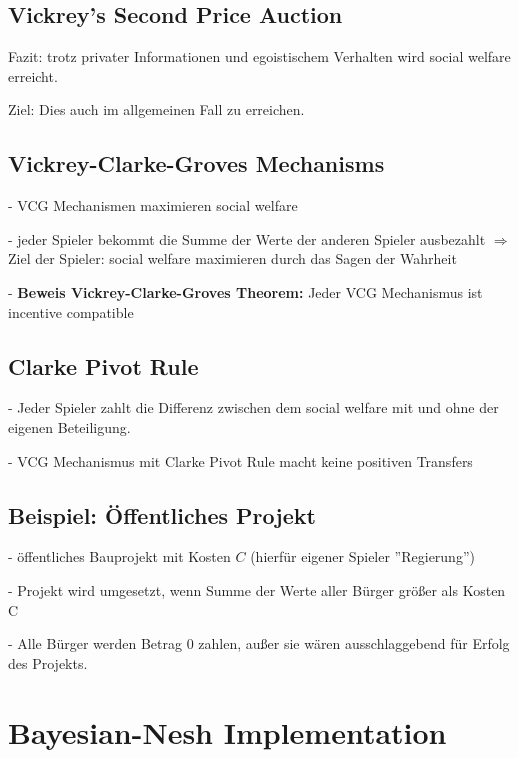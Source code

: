 \documentclass[a4paper,11pt]{article}
\theoremstyle{definition}
\theoremstyle{plain}
\theoremstyle{definition}
\begin{document}
\subsection{Vickrey's Second Price Auction}

Fazit: trotz privater Informationen und egoistischem Verhalten wird social welfare erreicht.

Ziel: Dies auch im allgemeinen Fall zu erreichen.

\subsection{Vickrey-Clarke-Groves Mechanisms}

- VCG Mechanismen maximieren social welfare

- jeder Spieler bekommt die Summe der Werte der anderen Spieler ausbezahlt $\Rightarrow$ Ziel der Spieler: social welfare maximieren durch das Sagen der Wahrheit

- \textbf{Beweis Vickrey-Clarke-Groves Theorem:} Jeder VCG Mechanismus ist incentive compatible

\subsection{Clarke Pivot Rule}

- Jeder Spieler zahlt die Differenz zwischen dem social welfare mit und ohne der eigenen Beteiligung.

- VCG Mechanismus mit Clarke Pivot Rule macht keine positiven Transfers

\subsection{Beispiel: Öffentliches Projekt}

- öffentliches Bauprojekt mit Kosten $C$ (hierfür eigener Spieler ''Regierung'')

- Projekt wird umgesetzt, wenn Summe der Werte aller Bürger größer als Kosten C

- Alle Bürger werden Betrag 0 zahlen, außer sie wären ausschlaggebend für Erfolg  des Projekts.


\section{Bayesian-Nesh Implementation}
\end{document}
